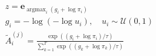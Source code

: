 ﻿\documentclass{article}
\begin{document}
\begin{preview}
\(\displaystyle
\begin{gathered}
  z = \bm e_{\operatorname{argmax}_i(g_i+\log \pi_i)} \\
  g_i = -\log(-\log u_i), \quad u_i\sim \mathcal{U}(0,1) \\
  \tilde{A}^{(j)}_i
  =\frac{\exp((g_i+\log \pi_i)/\tau)}
  {\sum_{k=1}^{T}\exp((g_k+\log \pi_k)/\tau)} 
\end{gathered}
\)
\end{preview}
\end{document}
